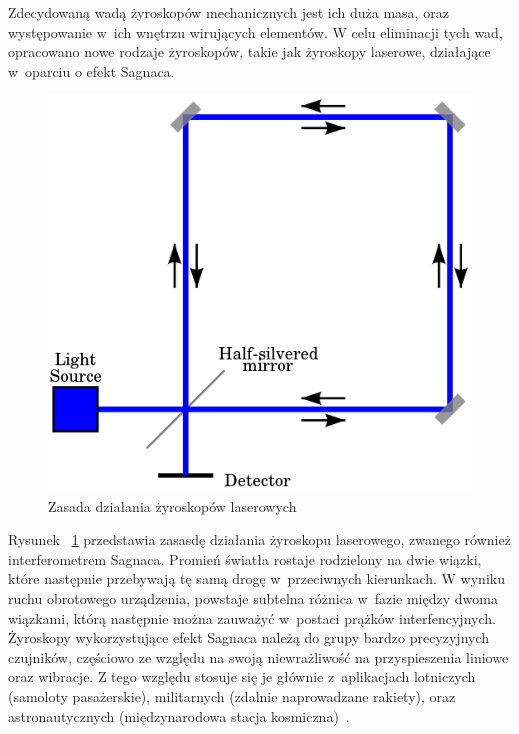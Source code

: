 \documentclass[11pt, twoside]{Thesis} %
\begin{document}
Zdecydowaną wadą żyroskopów mechanicznych jest ich duża masa, oraz występowanie w~ich wnętrzu wirujących elementów. W celu eliminacji tych wad, opracowano nowe rodzaje żyroskopów, takie jak żyroskopy laserowe, działające w~oparciu o efekt Sagnaca.

\begin{figure}[H]
	\centering
	\includegraphics[scale=0.4]{Pictures/Sagnac_interferometer.png}
        \caption[Zasada działania żyroskopów laserowych]{Zasada działania żyroskopów laserowych~\cite{mems9}}
        \label{fig:300px-SagnacPhase}
\end{figure}

Rysunek ~\ref{fig:300px-SagnacPhase} przedstawia zasasdę działania żyroskopu laserowego, zwanego również interferometrem Sagnaca. Promień światła rostaje rodzielony na dwie wiązki, które następnie przebywają tę samą drogę w~przeciwnych kierunkach. W wyniku ruchu obrotowego urządzenia, powstaje subtelna różnica w~fazie między dwoma wiązkami, którą następnie można zauważyć w~postaci prążków interfencyjnych. Żyroskopy wykorzystujące efekt Sagnaca należą do grupy bardzo precyzyjnych czujników, częściowo ze względu na swoją niewrażliwość na przyspieszenia liniowe oraz wibracje. Z tego względu stosuje się je głównie z~aplikacjach lotniczych (samoloty pasażerskie), militarnych (zdalnie naprowadzane rakiety), oraz astronautycznych (międzynarodowa stacja kosmiczna)~\cite{mems7, mems8}. 
\end{document}
